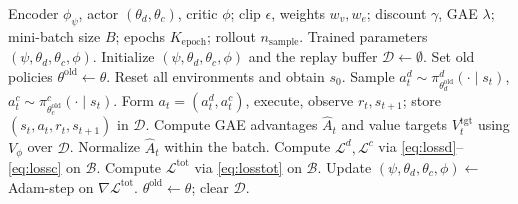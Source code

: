 \begin{algorithm}[t]
  \caption{\method-Based Joint Resource Allocation for Multi-UAV
  Semantic Communication}
  \label{alg:mahppo}
  \begin{algorithmic}[1]
    \REQUIRE Encoder $\phi_{\psi}$, actor $(\theta_{d},\theta_{c})$,
             critic $\phi$; clip $\epsilon$, weights $w_{v},w_{e}$;
             discount $\gamma$, GAE $\lambda$; mini-batch size $B$;
             epochs $K_{\mathrm{epoch}}$; rollout $n_{\mathrm{sample}}$.
    \ENSURE Trained parameters $(\psi,\theta_{d},\theta_{c},\phi)$.
    \STATE Initialize $(\psi,\theta_{d},\theta_{c},\phi)$ and the
           replay buffer $\mathcal{D}\leftarrow\emptyset$.
    \STATE Set old policies $\theta^{\mathrm{old}}\leftarrow\theta$.
      \STATE Reset all environments and obtain $s_{0}$.
        \STATE Sample $a^{d}_{t}\sim\pi^{d}_{\theta^{\mathrm{old}}_{d}}(\cdot\mid s_{t})$,
               $a^{c}_{t}\sim\pi^{c}_{\theta^{\mathrm{old}}_{c}}(\cdot\mid s_{t})$.
        \STATE Form $a_{t}=(a^{d}_{t},a^{c}_{t})$, execute, observe
               $r_{t},s_{t+1}$; store $(s_{t},a_{t},r_{t},s_{t+1})$ in
               $\mathcal{D}$.
      \ENDFOR
      \STATE Compute GAE advantages $\hat{A}_{t}$ and value targets
             $V^{\mathrm{tgt}}_{t}$ using $V_{\phi}$ over $\mathcal{D}$.
      \STATE Normalize $\hat{A}_{t}$ within the batch.
          \STATE Compute $\mathcal{L}^{d},\mathcal{L}^{c}$ via
                 \eqref{eq:lossd}--\eqref{eq:lossc} on $\mathcal{B}$.
          \STATE Compute $\mathcal{L}^{\mathrm{tot}}$ via
                 \eqref{eq:losstot} on $\mathcal{B}$.
          \STATE Update $(\psi,\theta_{d},\theta_{c},\phi)\leftarrow$
                 Adam-step on $\nabla\mathcal{L}^{\mathrm{tot}}$.
        \ENDFOR
      \ENDFOR
      \STATE $\theta^{\mathrm{old}}\leftarrow\theta$;
             clear $\mathcal{D}$.
    \ENDFOR
  \end{algorithmic}
\end{algorithm}

